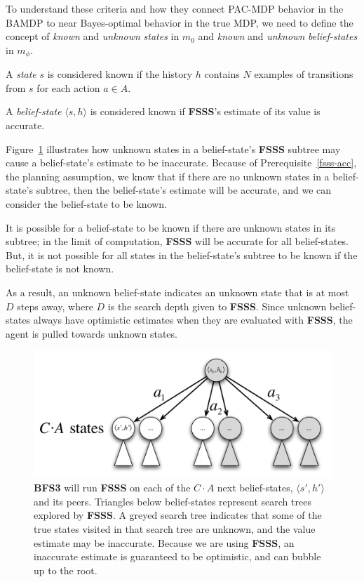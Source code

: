 To understand these criteria and how they connect PAC-MDP behavior in the BAMDP to near Bayes-optimal behavior in the true MDP, we need to define the concept of \emph{known} and \emph{unknown} \emph{states} in $m_0$ and  \emph{known} and \emph{unknown} \emph{belief-states} in $m_\phi$.

A \emph{state} $s$ is considered known if the history $h$ contains $N$ examples of transitions from $s$ for each action $a\in A$.

A \emph{belief-state} $\langle s, h \rangle$ is considered known if {\bf FSSS}'s estimate of its value is accurate.

Figure~\ref{fig:bfs3tree} illustrates how unknown states in a belief-state's {\bf FSSS} subtree may cause a belief-state's estimate to be inaccurate. Because of Prerequisite~\ref{fsss-acc}, the planning assumption, we know that if there are no unknown states in a belief-state's subtree, then the belief-state's estimate will be accurate, and we can consider the belief-state to be known.

It is possible for a belief-state to be known if there are unknown states in its subtree; in the limit of computation, {\bf FSSS} will be accurate for all belief-states. But, it is not possible for all states in the belief-state's subtree to be known if the belief-state is not known.

As a result, an unknown belief-state indicates an unknown state that is at most $D$ steps away, where $D$ is the search depth given to {\bf FSSS}. Since unknown belief-states always have optimistic estimates when they are evaluated with {\bf FSSS}, the agent is pulled towards unknown states.

\begin{figure}
\vskip 0.2in
\begin{center}
\centerline{\includegraphics[scale=0.5]{bfs3tree}}
\caption{
{\bf BFS3} will run {\bf FSSS} on each of the $C\cdot A$ next belief-states, $\langle s', h' \rangle$ and its peers. Triangles below belief-states represent search trees explored by {\bf FSSS}. A greyed search tree indicates that some of the true states visited in that search tree are unknown, and the value estimate may be inaccurate. Because we are using {\bf FSSS}, an inaccurate estimate is guaranteed to be optimistic, and can bubble up to the root.
}
\label{fig:bfs3tree}
\end{center}
\vskip -0.2in
\end{figure} 

